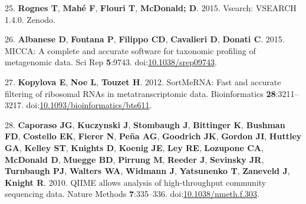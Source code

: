 \documentclass[11pt,]{article}
\begin{document}
\hypertarget{ref-Rognes2015}{}
25. \textbf{Rognes T}, \textbf{Mahé F}, \textbf{Flouri T},
\textbf{McDonald; D}. 2015. Vsearch: VSEARCH 1.4.0. Zenodo.

\hypertarget{ref-Albanese2015}{}
26. \textbf{Albanese D}, \textbf{Fontana P}, \textbf{Filippo CD},
\textbf{Cavalieri D}, \textbf{Donati C}. 2015. MICCA: A complete and
accurate software for taxonomic profiling of metagenomic data. Sci Rep
\textbf{5}:9743.
doi:\href{https://doi.org/10.1038/srep09743}{10.1038/srep09743}.

\hypertarget{ref-Kopylova2012}{}
27. \textbf{Kopylova E}, \textbf{Noe L}, \textbf{Touzet H}. 2012.
SortMeRNA: Fast and accurate filtering of ribosomal RNAs in
metatranscriptomic data. Bioinformatics \textbf{28}:3211--3217.
doi:\href{https://doi.org/10.1093/bioinformatics/bts611}{10.1093/bioinformatics/bts611}.

\hypertarget{ref-Caporaso2010}{}
28. \textbf{Caporaso JG}, \textbf{Kuczynski J}, \textbf{Stombaugh J},
\textbf{Bittinger K}, \textbf{Bushman FD}, \textbf{Costello EK},
\textbf{Fierer N}, \textbf{Peña AG}, \textbf{Goodrich JK},
\textbf{Gordon JI}, \textbf{Huttley GA}, \textbf{Kelley ST},
\textbf{Knights D}, \textbf{Koenig JE}, \textbf{Ley RE},
\textbf{Lozupone CA}, \textbf{McDonald D}, \textbf{Muegge BD},
\textbf{Pirrung M}, \textbf{Reeder J}, \textbf{Sevinsky JR},
\textbf{Turnbaugh PJ}, \textbf{Walters WA}, \textbf{Widmann J},
\textbf{Yatsunenko T}, \textbf{Zaneveld J}, \textbf{Knight R}. 2010.
QIIME allows analysis of high-throughput community sequencing data.
Nature Methods \textbf{7}:335--336.
doi:\href{https://doi.org/10.1038/nmeth.f.303}{10.1038/nmeth.f.303}.
\end{document}
